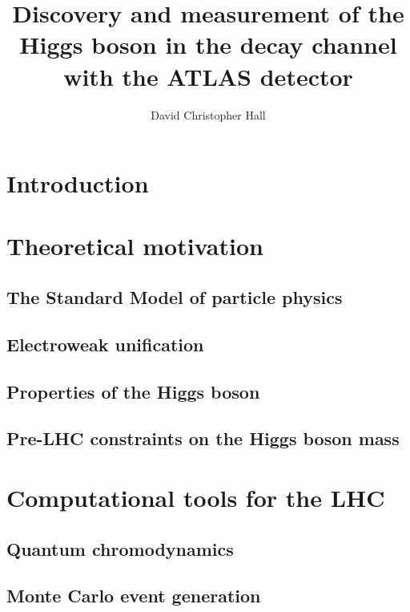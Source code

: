 \documentclass[hyper,linkcolor=blue]{mythesis}
\title{Discovery and measurement of the Higgs boson in the \WW decay channel with the ATLAS detector}
\author{David Christopher Hall}
\begin{document}
\begin{frontmatter}
  
\end{frontmatter}

\begin{mainmatter}
  \listoftodos
  
  
  \chapter*{Introduction}
    \label{chap:intro}
    

  \chapter{Theoretical motivation}
    \label{chap:motivation}
    
    \section{The Standard Model of particle physics}
      \label{sec:sm}
      
    \section{Electroweak unification}
      \label{sec:ewsb}
      
    \section{Properties of the Higgs boson}
      \label{sec:properties}
      
    \section{Pre-LHC constraints on the Higgs boson mass}
      \label{sec:prior_constraints}
      

  \chapter{Computational tools for the LHC}
    \label{chap:tools}
    
    \section{Quantum chromodynamics}
      \label{sec:qcd}
      
    \section{Monte Carlo event generation}
      \label{sec:mc}
      

\end{mainmatter}
\end{document}
